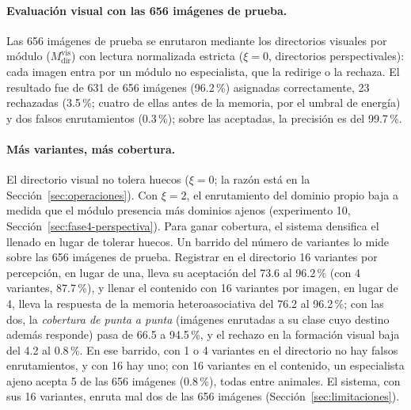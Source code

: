 \paragraph{Evaluación visual con las 656 imágenes de prueba.}
Las 656 imágenes de prueba se enrutaron mediante los directorios visuales por módulo
($M^{\mathrm{vis}}_{\mathrm{dir}}$) con lectura normalizada estricta ($\xi = 0$,
directorios perspectivales):
cada imagen entra por un módulo no especialista, que la redirige o la rechaza.
El resultado fue de 631 de 656 imágenes (96.2\,\%) asignadas correctamente, 23 rechazadas
(3.5\,\%; cuatro de ellas antes de la memoria, por el umbral de energía) y dos falsos
enrutamientos (0.3\,\%); sobre las aceptadas, la precisión es del 99.7\,\%.

\paragraph{Más variantes, más cobertura.}
El directorio visual no tolera huecos ($\xi = 0$; la razón está en la
Sección~\ref{sec:operaciones}).
Con $\xi = 2$, el enrutamiento del dominio propio baja a medida que el módulo presencia
más dominios ajenos (experimento 10, Sección~\ref{sec:fase4-perspectiva}).
Para ganar cobertura, el sistema densifica el llenado en lugar de tolerar huecos.
Un barrido del número de variantes lo mide sobre las 656 imágenes de prueba.
Registrar en el directorio 16 variantes por percepción, en lugar de una, lleva su
aceptación del 73.6 al 96.2\,\% (con 4 variantes, 87.7\,\%), y llenar el contenido con 16
variantes por imagen, en lugar de 4, lleva la respuesta de la memoria heteroasociativa
del 76.2 al 96.2\,\%; con las dos, la \emph{cobertura de punta a punta} (imágenes
enrutadas a su clase cuyo destino además responde) pasa de 66.5 a 94.5\,\%, y el rechazo
en la formación visual baja del 4.2 al 0.8\,\%.
En ese barrido, con 1 o 4 variantes en el directorio no hay falsos enrutamientos, y con
16 hay uno; con 16 variantes en el contenido, un especialista ajeno acepta 5 de las 656
imágenes (0.8\,\%), todas entre animales.
El sistema, con sus 16 variantes, enruta mal dos de las 656 imágenes
(Sección~\ref{sec:limitaciones}).

